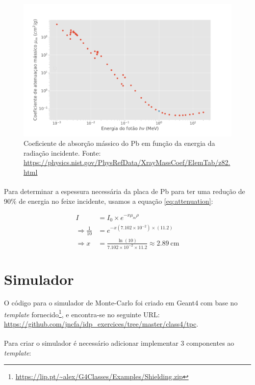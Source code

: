 \documentclass[a4paper, 12pt]{article} %
\begin{document}
	\begin{figure}[H]
		\centering
		\includegraphics[width=0.6\linewidth]{u_plot.pdf}
		\caption{Coeficiente de absorção mássico do Pb em função da energia da radiação incidente. Fonte: \url{https://physics.nist.gov/PhysRefData/XrayMassCoef/ElemTab/z82.html}}
		\label{fig:attenuation}
	\end{figure}

	\paragraph{} Para determinar a espessura necessária da placa de Pb para ter uma redução de 90\% de energia no feixe incidente, usamos a equação \ref{eq:attenuation}:


	\begin{align}
		I &= I_0 \times e^{-x\mu_m\rho} \\
		\Rightarrow \frac{1}{10} &= e^{-x(7.102 \times 10^{-2})\times(11.2)}\\
		\Rightarrow x&=\frac{\ln(10)}{7.102 \times 10^{-2}\times 11.2} \approx 2.89\ \text{cm}
		\label{eq:attenuation_result}
	\end{align}

	\section{Simulador}
	O código para o simulador de Monte-Carlo foi criado em Geant4 com base no \textit{template} fornecido\footnote{\url{https://lip.pt/~alex/G4Classes/Examples/Shielding.zip}}, e encontra-se no seguinte URL: \url{https://github.com/jncfa/idp_exercices/tree/master/class4/tpc}.

	\paragraph{} Para criar o simulador é necessário adicionar implementar 3 componentes ao \textit{template}:
	
\end{document}
